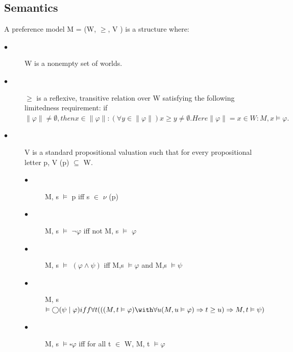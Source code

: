 \documentclass{article}
\begin{document}
\subsection{Semantics}
A preference model M = (W, $\geq$, V ) is a structure where:
\begin{description}
\item[$\bullet$ ] W is a nonempty set of worlds.
\item[$\bullet $] $ \geq$ is a reflexive, transitive relation over W satisfying the following limitedness requirement: if $\|\varphi\| \neq \emptyset, then {x\in\|\varphi\| : (\forall y \in \|\varphi\|)x\geq y} \neq \emptyset. Here\|\varphi\| = {x \in W : M, x\vDash \varphi}.$
\item[$\bullet$]V is a standard propositional valuation such that for every propositional letter p, V (p) $\subseteq$ W.
\begin{description}
\item[$\bullet$ ]M, s $ \vDash $ p iff s $\in$ $\nu$  (p)
\item[$\bullet$ ]M, s $ \vDash $ $\neg \varphi$ iff not M, s $ \vDash $ $\varphi$
\item[$\bullet$ ]M, s $ \vDash $ $(\varphi\land\psi )$ iff M,s $ \vDash \varphi$ and  M,s $ \vDash \psi$
\item[$\bullet$ ]M, s $ \vDash  \bigcirc(\psi\mid\varphi) iff \forall t(((M, t \vDash \varphi)\with\forall u(M, u \vDash \varphi) \Rightarrow t \geq u) \Rightarrow M, t \vDash \psi)$
\item[$\bullet$ ]M, s $ \vDash  \square\varphi$ iff for all t $\in$ W, M, t $\vDash \varphi$
\end{description}
\end{description}
\end{document}
